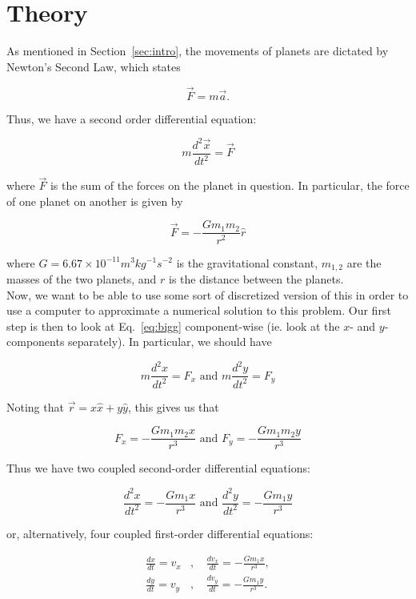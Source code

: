 \documentclass[12pt]{article}
\numberwithin{equation}{section}
\begin{document}
\section{Theory}
\label{sec:theory}

As mentioned in Section~\ref{sec:intro}, the movements of planets are dictated by Newton's Second Law, which states

$$\vec{F} = m\vec{a}.$$

\noindent Thus, we have a second order differential equation:

$$m\frac{d^{2}\vec{x}}{dt^{2}} = \vec{F}$$

\noindent where $\vec{F}$ is the sum of the forces on the planet in question.  In particular, the force of one planet on another is given by

\begin{equation}
\label{eq:bigg}
\vec{F} = -\frac{Gm_{1}m_{2}}{r^{2}}\hat{r}
\end{equation}

\noindent where $G = 6.67\times10^{-11} m^{3}kg^{-1}s^{-2}$ is the gravitational constant, $m_{1,2}$ are the masses of the two planets, and $r$ is the distance between the planets.
\\\indent Now, we want to be able to use some sort of discretized version of this in order to use a computer to approximate a numerical solution to this problem.  Our first step is then to look at Eq.~\ref{eq:bigg} component-wise (ie. look at the $x$- and $y$- components separately).  In particular, we should have

$$
m\frac{d^{2}x}{dt^{2}} = F_{x} \text{ and } m\frac{d^{2}y}{dt^{2}} = F_{y}
$$

\noindent Noting that $\vec{r}=x\hat{x}+y\hat{y}$, this gives us that

$$
F_{x} = -\frac{Gm_{1}m_{2}x}{r^{3}}\text{ and } F_{y} = -\frac{Gm_{1}m_{2}y}{r^{3}}
$$

\noindent Thus we have two coupled second-order differential equations:

\begin{equation}
\label{eq:diffeqs1}
\frac{d^{2}x}{dt^{2}} = -\frac{Gm_{1}x}{r^{3}}\text{ and } \frac{d^{2}y}{dt^{2}} = -\frac{Gm_{1}y}{r^{3}}
\end{equation}

\noindent or, alternatively, four coupled first-order differential equations:

\begin{equation}
\label{eq:diffeqs2}
\begin{align}
\frac{dx}{dt} = v_{x} &\text{, }&\frac{dv_{x}}{dt}=-\frac{Gm_{1}x}{r^{3}}, \\
\frac{dy}{dt} = v_{y} &\text{, }&\frac{dv_{y}}{dt}=-\frac{Gm_{1}y}{r^{3}}.
\end{align}
\end{equation}
\end{document}
